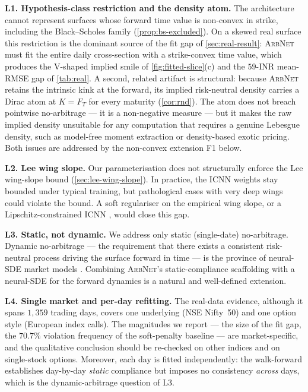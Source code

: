 \documentclass[largeformat]{interact}
\let\cite\citep   %
\theoremstyle{plain}
\theoremstyle{definition}
\newcommand{\arbnet}{\textsc{ArbNet}}
\newcommand{\bs}{Black--Scholes}
\begin{document}
\smallskip\noindent\textbf{L1. Hypothesis-class restriction and the density atom.}
The architecture cannot represent surfaces whose forward time value is non-convex in strike, including the \bs{} family (\cref{prop:bs-excluded}). On a skewed real surface this restriction is the dominant source of the fit gap of \cref{sec:real-result}: \arbnet{} must fit the entire daily cross-section with a strike-convex time value, which produces the V-shaped implied smile of \cref{fig:fitted-slice}(c) and the $59$-INR mean-RMSE gap of \cref{tab:real}. A second, related artifact is structural: because \arbnet{} retains the intrinsic kink at the forward, its implied risk-neutral density carries a Dirac atom at $K = F_T$ for every maturity (\cref{cor:rnd}). The atom does not breach pointwise no-arbitrage --- it is a non-negative measure --- but it makes the raw implied density unsuitable for any computation that requires a genuine Lebesgue density, such as model-free moment extraction or density-based exotic pricing. Both issues are addressed by the non-convex extension F1 below.

\smallskip\noindent\textbf{L2. Lee wing slope.}
Our parameterisation does not structurally enforce the Lee wing-slope bound (\cref{sec:lee-wing-slope}). In practice, the ICNN weights stay bounded under typical training, but pathological cases with very deep wings could violate the bound. A soft regulariser on the empirical wing slope, or a Lipschitz-constrained ICNN \cite{wehenkel2019unconstrained,runje2023constrained}, would close this gap.

\smallskip\noindent\textbf{L3. Static, not dynamic.}
We address only static (single-date) no-arbitrage. Dynamic no-arbitrage --- the requirement that there exists a consistent risk-neutral process driving the surface forward in time --- is the province of neural-SDE market models \cite{cohen2023arbitrage,cuchiero2020generative,gambara2021consistent}. Combining \arbnet{}'s static-compliance scaffolding with a neural-SDE for the forward dynamics is a natural and well-defined extension.

\smallskip\noindent\textbf{L4. Single market and per-day refitting.}
The real-data evidence, although it spans $1{,}359$ trading days, covers one underlying (NSE Nifty~50) and one option style (European index calls). The magnitudes we report --- the size of the fit gap, the $70.7\%$ violation frequency of the soft-penalty baseline --- are market-specific, and the qualitative conclusion should be re-checked on other indices and on single-stock options. Moreover, each day is fitted independently: the walk-forward establishes day-by-day \emph{static} compliance but imposes no consistency \emph{across} days, which is the dynamic-arbitrage question of L3.
\end{document}
